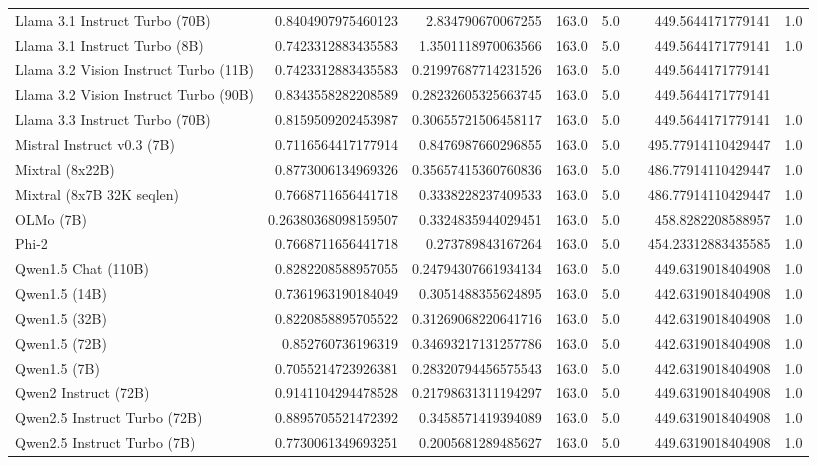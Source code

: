 \begin{table}[htp]
{\begin{tabular}{lrrrrrrr}
Llama 3.1 Instruct Turbo (70B) & 0.8404907975460123 & 2.834790670067255 & 163.0 & 5.0 &  & 449.5644171779141 & 1.0 \\
Llama 3.1 Instruct Turbo (8B) & 0.7423312883435583 & 1.3501118970063566 & 163.0 & 5.0 &  & 449.5644171779141 & 1.0 \\
Llama 3.2 Vision Instruct Turbo (11B) & 0.7423312883435583 & 0.21997687714231526 & 163.0 & 5.0 &  & 449.5644171779141 &  \\
Llama 3.2 Vision Instruct Turbo (90B) & 0.8343558282208589 & 0.28232605325663745 & 163.0 & 5.0 &  & 449.5644171779141 &  \\
Llama 3.3 Instruct Turbo (70B) & 0.8159509202453987 & 0.30655721506458117 & 163.0 & 5.0 &  & 449.5644171779141 & 1.0 \\
Mistral Instruct v0.3 (7B) & 0.7116564417177914 & 0.8476987660296855 & 163.0 & 5.0 &  & 495.77914110429447 & 1.0 \\
Mixtral (8x22B) & 0.8773006134969326 & 0.35657415360760836 & 163.0 & 5.0 &  & 486.77914110429447 & 1.0 \\
Mixtral (8x7B 32K seqlen) & 0.7668711656441718 & 0.3338228237409533 & 163.0 & 5.0 &  & 486.77914110429447 & 1.0 \\
OLMo (7B) & 0.26380368098159507 & 0.3324835944029451 & 163.0 & 5.0 &  & 458.8282208588957 & 1.0 \\
Phi-2 & 0.7668711656441718 & 0.273789843167264 & 163.0 & 5.0 &  & 454.23312883435585 & 1.0 \\
Qwen1.5 Chat (110B) & 0.8282208588957055 & 0.24794307661934134 & 163.0 & 5.0 &  & 449.6319018404908 & 1.0 \\
Qwen1.5 (14B) & 0.7361963190184049 & 0.3051488355624895 & 163.0 & 5.0 &  & 442.6319018404908 & 1.0 \\
Qwen1.5 (32B) & 0.8220858895705522 & 0.31269068220641716 & 163.0 & 5.0 &  & 442.6319018404908 & 1.0 \\
Qwen1.5 (72B) & 0.852760736196319 & 0.34693217131257786 & 163.0 & 5.0 &  & 442.6319018404908 & 1.0 \\
Qwen1.5 (7B) & 0.7055214723926381 & 0.28320794456575543 & 163.0 & 5.0 &  & 442.6319018404908 & 1.0 \\
Qwen2 Instruct (72B) & 0.9141104294478528 & 0.21798631311194297 & 163.0 & 5.0 &  & 449.6319018404908 & 1.0 \\
Qwen2.5 Instruct Turbo (72B) & 0.8895705521472392 & 0.3458571419394089 & 163.0 & 5.0 &  & 449.6319018404908 & 1.0 \\
Qwen2.5 Instruct Turbo (7B) & 0.7730061349693251 & 0.2005681289485627 & 163.0 & 5.0 &  & 449.6319018404908 & 1.0 \\

\end{tabular}}
\end{table}
